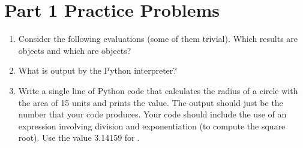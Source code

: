 \documentclass[letterpaper,10pt,english]{sphinxmanual}
\begin{document}
\section{Part 1 Practice Problems}
\label{\detokenize{lecture_notes/lec02_calculator:part-1-practice-problems}}\begin{enumerate}
\def\theenumi{\arabic{enumi}}
\def\labelenumi{\theenumi .}
\makeatletter\def\p@enumii{\p@enumi \theenumi .}\makeatother
\item {} 
Consider the following evaluations (some of them trivial). Which results
are  objects and which are  objects?

\begin{sphinxVerbatim}[commandchars=\\\{\}]
            
           
          
          
         
          
         
        
\end{sphinxVerbatim}

\item {} 
What is output by the Python interpreter?

\begin{sphinxVerbatim}[commandchars=\\\{\}]
    
\end{sphinxVerbatim}

\item {} 
Write a single line of Python code that calculates the radius of a
circle with the area of 15 units and prints the value.  The output should
just be the number that your code produces.  Your code should include
the use of an expression involving division and exponentiation (to
compute the square root).  Use the value 3.14159 for .

\end{enumerate}
\end{document}
